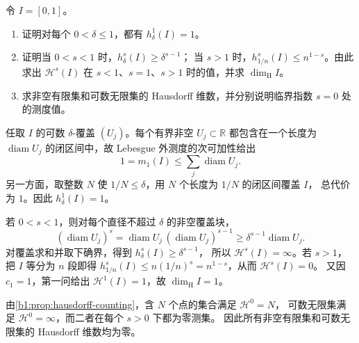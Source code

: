 \begin{exercise}[覆盖量与基本维数]\label{b1:ex:15-basic-covering-dimensions}
令 \(I=[0,1]\)。
\begin{enumerate}
\item\label{b1:item:15-interval-one-content}
证明对每个 \(0<\delta\leq1\)，都有 \(h^1_\delta(I)=1\)。
\item\label{b1:item:15-interval-critical-exponent}
证明当 \(0<s<1\) 时，\(h^s_\delta(I)\geq\delta^{s-1}\)；
当 \(s>1\) 时，\(h^s_{1/n}(I)\leq n^{1-s}\)。由此求出
\(\mathcal H^s(I)\) 在 \(s<1\)、\(s=1\)、\(s>1\) 时的值，并求 \(\dim_{\mathrm H}I\)。
\item\label{b1:item:15-finite-countable-dimension}
求非空有限集和可数无限集的 Hausdorff 维数，并分别说明临界指数 \(s=0\) 处的测度值。
\end{enumerate}
\end{exercise}
\begin{solution}
任取 \(I\) 的可数 \(\delta\)-覆盖 \((U_j)\)。每个有界非空 \(U_j\subset\mathbb R\)
都包含在一个长度为 \(\operatorname{diam}U_j\) 的闭区间中，故 Lebesgue 外测度的次可加性给出
\[
 1=m_1(I)\leq\sum_j\operatorname{diam}U_j.
\]
另一方面，取整数 \(N\) 使 \(1/N\leq\delta\)，用 \(N\) 个长度为 \(1/N\) 的闭区间覆盖 \(I\)，
总代价为 \(1\)。因此 \(h^1_\delta(I)=1\)。

若 \(0<s<1\)，则对每个直径不超过 \(\delta\) 的非空覆盖块，
\[
 (\operatorname{diam}U_j)^s
 =\operatorname{diam}U_j\,(\operatorname{diam}U_j)^{s-1}
 \geq\delta^{s-1}\operatorname{diam}U_j.
\]
对覆盖求和并取下确界，得到 \(h^s_\delta(I)\geq\delta^{s-1}\)，
所以 \(\mathcal H^s(I)=\infty\)。若 \(s>1\)，把 \(I\) 等分为 \(n\) 段即得
\(h^s_{1/n}(I)\leq n(1/n)^s=n^{1-s}\)，从而 \(\mathcal H^s(I)=0\)。
又因 \(c_1=1\)，第一问给出 \(\mathcal H^1(I)=1\)，故 \(\dim_{\mathrm H}I=1\)。

由\cref{b1:prop:hausdorff-counting}，含 \(N\) 个点的集合满足 \(\mathcal H^0=N\)，
可数无限集满足 \(\mathcal H^0=\infty\)，而二者在每个 \(s>0\) 下都为零测集。
因此所有非空有限集和可数无限集的 Hausdorff 维数均为零。
\end{solution}

